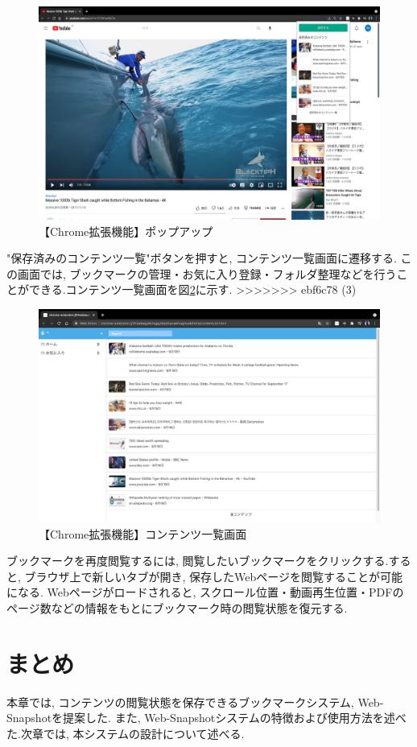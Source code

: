 \begin{figure}[htbp]
  \caption{【Chrome拡張機能】ポップアップ}
  \label{fig:usage-chrome-popup}
  \begin{center}
    \includegraphics[bb=0 0 915 667,width=15cm]{img/usage-chrome-popup.pdf}
  \end{center}
\end{figure}

"保存済みのコンテンツ一覧"ボタンを押すと, コンテンツ一覧画面に遷移する.
この画面では, ブックマークの管理・お気に入り登録・フォルダ整理などを行うことができる.コンテンツ一覧画面を図\ref{fig:usage-chrome-list}に示す.
>>>>>>> ebf6c78 (3)

\begin{figure}[htbp]
  \caption{【Chrome拡張機能】コンテンツ一覧画面}
  \label{fig:usage-chrome-list}
  \begin{center}
    \includegraphics[bb=0 0 915 667,width=15cm]{img/usage-chrome-list.pdf}
  \end{center}
\end{figure}

ブックマークを再度閲覧するには, 閲覧したいブックマークをクリックする.すると, ブラウザ上で新しいタブが開き, 保存したWebページを閲覧することが可能になる.
Webページがロードされると, スクロール位置・動画再生位置・PDFのページ数などの情報をもとにブックマーク時の閲覧状態を復元する.

\section{まとめ}
本章では, コンテンツの閲覧状態を保存できるブックマークシステム, Web-Snapshotを提案した.
また, Web-Snapshotシステムの特徴および使用方法を述べた.次章では, 本システムの設計について述べる.